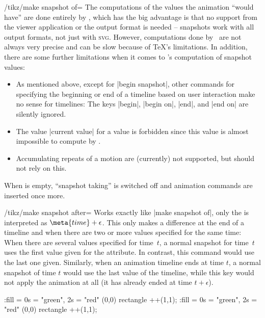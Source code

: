 \begin{key}{/tikz/make snapshot of=}
    The computations of the values the animation ``would have'' are done
    entirely by \tikzname, which has the big advantage is that no support from
    the viewer application or the output format is needed -- snapshots work
    with all output formats, not just with \textsc{svg}. However, computations
    done by \tikzname\ are not always very precise and can be slow because of
    \TeX's limitations. In addition, there are some further limitations when it
    comes to \tikzname's computation of snapshot values:
    \begin{itemize}
        \item As mentioned above, except for |begin snapshot|, other commands
            for specifying the beginning or end of a timeline based on user
            interaction make no sense for timelines: The keys |begin|,
            |begin on|, |end|, and |end on| are silently ignored.
        \item The value |current value| for a value is forbidden since this
            value is almost impossible to compute by \tikzname.
        \item Accumulating repeats of a motion are (currently) not supported,
            but should not rely on this.
    \end{itemize}

    When  is empty, ``snapshot taking'' is switched off and
    animation commands are inserted once more.
\end{key}

\begin{key}{/tikz/make snapshot after=}
    Works exactly like |make snapshot of|, only the  is interpreted
    as $\meta{time} + \epsilon$. This only makes a difference at the end of a
    timeline and when there are two or more values specified for the same time:
    When there are several values specified for time~$t$, a normal snapshot for
    time~$t$ uses the first value given for the attribute. In contrast, this
    command would use the last one given. Similarly, when an animation timeline
    ends at time $t$, a normal snapshot of time $t$ would use the last value of
    the timeline, while this key would not apply the animation at all (it has
    already ended at time $t + \epsilon$).
\begin{codeexample}[preamble={\usetikzlibrary{animations}}]
\tikz [make snapshot of = 2s]
  \fill :fill = { 0s = "green", 2s = "red" } (0,0) rectangle ++(1,1);
\tikz [make snapshot after = 2s]
  \fill :fill = { 0s = "green", 2s = "red" } (0,0) rectangle ++(1,1);
\end{codeexample}
\end{key}

